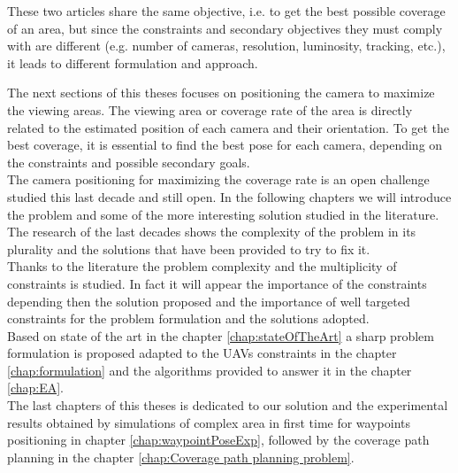 
These two articles share the same objective, i.e. to get the best possible coverage of an area, but since the constraints and secondary objectives they must comply with are different (e.g. number of cameras, resolution, luminosity, tracking, etc.), it leads to different formulation and approach. 

The next sections of this theses focuses on positioning the camera to maximize the viewing areas. The viewing area or coverage rate of the area is directly related to the estimated position of each camera and their orientation. To get the best coverage, it is essential to find the best pose for each camera, depending on the constraints and possible secondary goals.\\

The camera positioning for maximizing  the coverage rate is an open challenge studied this last decade and still open. 
In the following chapters we will introduce  the problem and some of the more interesting solution studied in the literature.
The research of the last decades  shows the complexity of the problem in its plurality and the solutions that have been provided to try to fix it.\\
Thanks to the literature the problem complexity and the multiplicity of constraints is studied. In fact it will appear the importance of the constraints depending then the solution proposed and the importance of well targeted constraints for the problem formulation and the solutions adopted. \\
Based on state of the art  in the chapter \ref{chap:stateOfTheArt} a sharp problem formulation is proposed adapted to the UAVs constraints in the chapter \ref{chap:formulation} and the algorithms provided to answer it in the chapter \ref{chap:EA}. \\
The last chapters of this theses is dedicated to our solution and the experimental results obtained by simulations of complex area in first time for waypoints positioning in chapter \ref{chap:waypointPoseExp}, followed by the coverage path planning in the chapter \ref{chap:Coverage path planning problem}.
 
